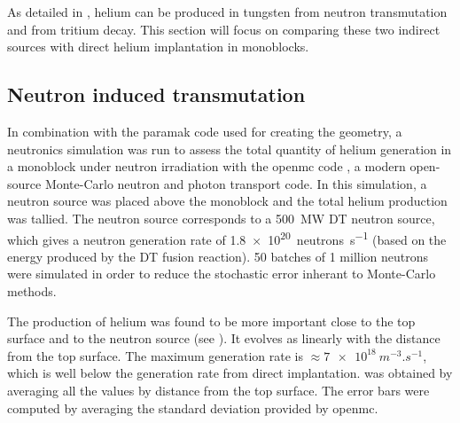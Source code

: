 As detailed in , helium can be produced in tungsten from neutron \gls{transmutation} and from tritium decay.
This section will focus on comparing these two indirect sources with direct helium implantation in \glspl{monoblock}.

\subsection{Neutron induced transmutation}

In combination with the \gls{paramak} code  used for creating the geometry, a neutronics simulation was run to assess the total quantity of helium generation in a \gls{monoblock} under neutron irradiation with the \gls{openmc} code , a modern open-source Monte-Carlo neutron and photon transport code.
In this simulation, a neutron source was placed above the \gls{monoblock} and the total helium production was tallied.
The neutron source corresponds to a \SI{500}{MW} DT neutron source, which gives a neutron generation rate of \SI{1.8e20}{neutrons.s^{-1}} (based on the energy produced by the DT fusion reaction).
50 batches of 1 million neutrons were simulated in order to reduce the stochastic error inherant to Monte-Carlo methods.

The production of helium was found to be more important close to the top surface and to the neutron source (see ).
It evolves as linearly with the distance from the top surface.
The maximum generation rate is $\approx \SI{7e18}{m^{-3}.s^{-1}}$, which is well below the generation rate from direct implantation.
 was obtained by averaging all the values by distance from the top surface.
The error bars were computed by averaging the standard deviation provided by \gls{openmc}.

